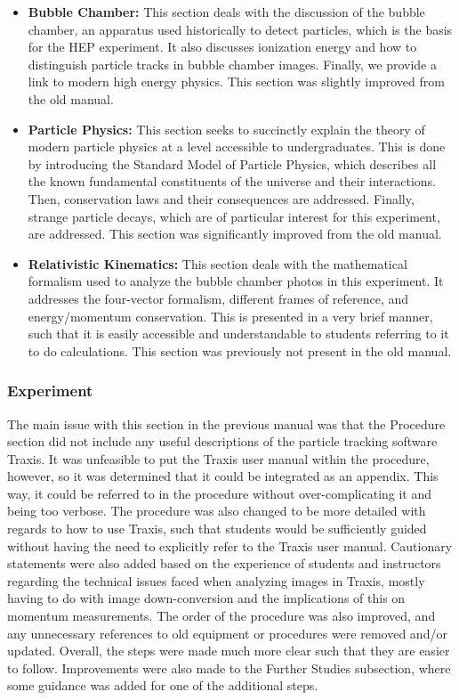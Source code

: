\documentclass[12pt]{article} %
\begin{document}
\begin{itemize}
    \item \textbf{Bubble Chamber:}
    This section deals with the discussion of the bubble chamber, an apparatus used historically to detect particles, which is the basis for the HEP experiment. It also discusses ionization energy and how to distinguish particle tracks in bubble chamber images. Finally, we provide a link to modern high energy physics. This section was slightly improved from the old manual.
    \item \textbf{Particle Physics:}
    This section seeks to succinctly explain the theory of modern particle physics at a level accessible to undergraduates. This is done by introducing the Standard Model of Particle Physics, which describes all the known fundamental constituents of the universe and their interactions. Then, conservation laws and their consequences are addressed. Finally, strange particle decays, which are of particular interest for this experiment, are addressed. This section was significantly improved from the old manual.
    \item \textbf{Relativistic Kinematics:}
    This section deals with the mathematical formalism used to analyze the bubble chamber photos in this experiment. It addresses the four-vector formalism, different frames of reference, and energy/momentum conservation. This is presented in a very brief manner, such that it is easily accessible and understandable to students referring to it to do calculations. This section was previously not present in the old manual.
\end{itemize}


\subsubsection{Experiment}\label{sec:updated_manual_experiment}
The main issue with this section in the previous manual was that the Procedure section did not include any useful descriptions of the particle tracking software Traxis. It was unfeasible to put the Traxis user manual within the procedure, however, so it was determined that it could be integrated as an appendix. This way, it could be referred to in the procedure without over-complicating it and being too verbose. The procedure was also changed to be more detailed with regards to how to use Traxis, such that students would be sufficiently guided without having the need to explicitly refer to the Traxis user manual. Cautionary statements were also added based on the experience of students and instructors regarding the technical issues faced when analyzing images in Traxis, mostly having to do with image down-conversion and the implications of this on momentum measurements. The order of the procedure was also improved, and any unnecessary references to old equipment or procedures were removed and/or updated. Overall, the steps were made much more clear such that they are easier to follow. Improvements were also made to the Further Studies subsection, where some guidance was added for one of the additional steps. 
\end{document}
